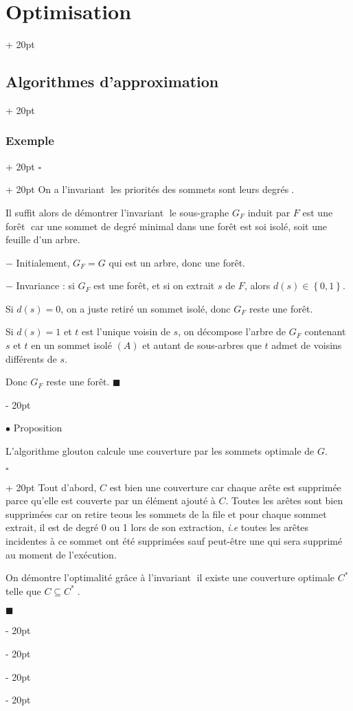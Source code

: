 \documentclass[a4paper, 12pt, twoside]{article}
\newcommand{\set}[1]{\left\{ #1 \right\}}
\newcommand{\simplecit}[1]{\guillemotleft$\;$#1$\;$\guillemotright}
\newcommand{\ind}[1][20pt]{\advance\leftskip + #1}
\newcommand{\deind}[1][20pt]{\advance\leftskip - #1}
\newenvironment{indt}[2][20pt]{#2 \par \ind[#1]}{\par \deind} %
\newenvironment{proof}[1][{}]{\begin{indt}{$\square$ #1}}{$\blacksquare$ \end{indt}}
\newcommand{\1}{\mathbbm 1}
\begin{document}
\begin{indt}{\section{Optimisation}}
\begin{indt}{\subsection{Algorithmes d'approximation}}
\begin{indt}{\subsubsection{Exemple}}
                \begin{proof}
                    On a l'invariant \simplecit{les priorités des sommets sont leurs degrés}.

                    Il suffit alors de démontrer l'invariant \simplecit{le sous-graphe $G_F$ induit par $F$ est une forêt} car une sommet de degré minimal dans une forêt est soi isolé, soit une feuille d'un arbre.

                    $-$ Initialement, $G_F = G$ qui est un arbre, donc une forêt.

                    $-$ Invariance : si $G_F$ est une forêt, et si on extrait $s$ de $F$,
                    alors $d(s) \in \set{0, 1}$.

                    Si $d(s) = 0$, on a juste retiré un sommet isolé, donc $G_F$ reste une forêt.

                    Si $d(s) = 1$ et $t$ est l'unique voisin de $s$, on décompose l'arbre de $G_F$ contenant $s$ et $t$ en un sommet isolé $(A)$ et autant de sous-arbres que $t$ admet de voisins différents de $s$.

                    Donc $G_F$ reste une forêt.
                \end{proof}

                \vspace{12pt}
                
                $\bullet$ Proposition
                \begin{emphBox}
                    L'algorithme glouton calcule une couverture par les sommets optimale de $G$.
                \end{emphBox}

                \vspace{6pt}
                
                \begin{proof}
                    Tout d'abord, $C$ est bien une couverture car chaque arête est supprimée parce qu'elle est couverte par un élément ajouté à $C$.
                    Toutes les arêtes sont bien supprimées car on retire teous les sommets de la file et pour chaque sommet extrait, il est de degré 0 ou 1 lors de son extraction, \textit{i.e} toutes les arêtes incidentes à ce sommet ont été supprimées sauf peut-être une qui sera supprimé au moment de l'exécution.

                    \vspace{12pt}
                    
                    On démontre l'optimalité grâce à l'invariant \simplecit{il existe une couverture optimale $C^*$ telle que $C \subseteq C^*$}.


\end{proof}
\end{indt}
\end{indt}
\end{indt}
\end{document}
